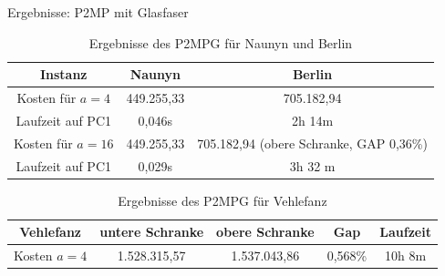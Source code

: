 \documentclass{beamer}
\begin{document}
\begin{frame}{Ergebnisse: P2MP mit Glasfaser}
 \begin{table}[h]
 	\centering
 	\begin{tabular}{c|c|c}
 		Instanz & Naunyn & Berlin \\	
 		\hline
 		Kosten für $a=4$ & 449.255,33 & 705.182,94 \\
 		Laufzeit auf PC1 & 0,046s & 2h 14m \\
 		\hline
 		Kosten für $a=16$ & 449.255,33 & 705.182,94 (obere Schranke, GAP 0,36\%) \\
 		Laufzeit auf PC1 & 0,029s & 3h 32 m \\
 	\end{tabular}
 	\caption{Ergebnisse des P2MPG f\"ur Naunyn und Berlin}
 	\label{P2MPG_Tabelle_N_B}
 \end{table}
 
 \begin{table}[h]
 	\centering
 	\begin{tabular}{c|c|c|c|c}
 		Vehlefanz & untere Schranke & obere Schranke & Gap & Laufzeit\\
 		\hline
 		Kosten $a=4$ & 1.528.315,57 & 1.537.043,86 & 0,568\% & 10h 8m\\
 	\end{tabular}
 	\caption{Ergebnisse des P2MPG f\"ur Vehlefanz}
 	\label{P2MPG_Tabelle_V}
 \end{table}
\end{frame}
\end{document}
